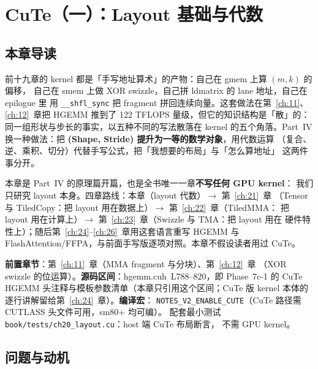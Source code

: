\makeatletter
\providecommand{\urlchbrk}[1]{\@tfor\next:=#1\do{\next\allowbreak}}
\makeatother
\providecommand{\url}[1]{{\ttfamily\urlchbrk{#1}}}
\chapter{CuTe（一）：Layout 基础与代数}\label{ch:20}

\section{本章导读}

前十九章的 kernel 都是「手写地址算术」的产物：自己在 gmem 上算 $(m,k)$ 的偏移，
自己在 smem 上做 XOR swizzle，自己拼 ldmatrix 的 lane 地址，自己在 epilogue 里
用 \texttt{\_\_shfl\_sync} 把 fragment 拼回连续向量。这套做法在第~\ref{ch:11}、
\ref{ch:12}~章把 HGEMM 推到了 122 TFLOPS 量级，但它的知识结构是「散」的：
同一组形状与步长的事实，以五种不同的写法散落在 kernel 的五个角落。Part~IV
换一种做法：把 \textbf{(Shape, Stride) 提升为一等的数学对象}，用代数运算
（复合、逆、乘积、切分）代替手写公式，把「我想要的布局」与「怎么算地址」
这两件事分开。

本章是 Part~IV 的原理篇开篇，也是全书唯一一章\textbf{不写任何 GPU kernel}：
我们只研究 layout 本身。四章路线：本章（layout 代数）$\to$ 第~\ref{ch:21}~章
（Tensor 与 TiledCopy：把 layout 用在数据上）$\to$ 第~\ref{ch:22}~章（TiledMMA：
把 layout 用在计算上）$\to$ 第~\ref{ch:23}~章（Swizzle 与 TMA：把 layout 用在
硬件特性上）；随后第~\ref{ch:24}--\ref{ch:26}~章用这套语言重写 HGEMM 与
FlashAttention/FFPA，与前面手写版逐项对照。本章不假设读者用过 CuTe。

\textbf{前置章节}：第~\ref{ch:11}~章（MMA fragment 与分块）、第~\ref{ch:12}~章
（XOR swizzle 的位运算）。\textbf{源码区间}：hgemm.cuh~L788--820，即
Phase~7c-1 的 CuTe HGEMM 头注释与模板参数清单（本章只引用这个区间；CuTe 版
kernel 本体的逐行讲解留给第~\ref{ch:24}~章）。\textbf{编译宏}：
\texttt{NOTES\_\allowbreak{}V2\_\allowbreak{}ENABLE\_\allowbreak{}CUTE}（CuTe 路径需 CUTLASS 头文件可用，sm80+ 均可编）。
配套最小测试 \texttt{book/\allowbreak{}tests/\allowbreak{}ch20\_\allowbreak{}layout.\allowbreak{}cu}：host 端 CuTe 布局断言，
不需 GPU kernel。

\section{问题与动机}

